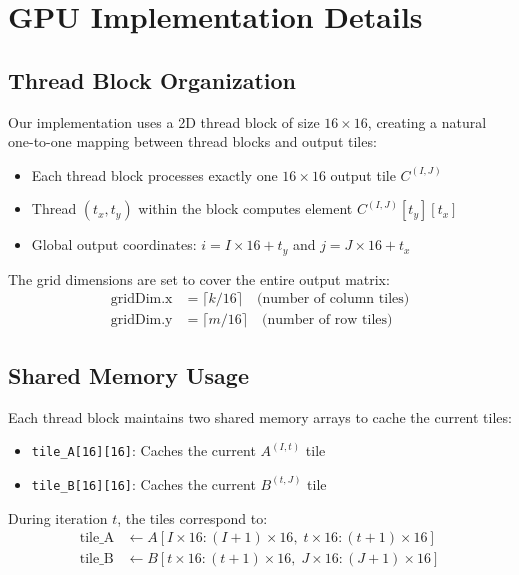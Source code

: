 \documentclass{amsbook}
\theoremstyle{definition}
\begin{document}
\section{GPU Implementation Details}

\subsection{Thread Block Organization}

Our implementation uses a 2D thread block of size $16 \times 16$, creating a natural one-to-one mapping between thread blocks and output tiles:
\begin{itemize}
\item Each thread block processes exactly one $16 \times 16$ output tile $C^{(I,J)}$
\item Thread $(t_x, t_y)$ within the block computes element $C^{(I,J)}[t_y][t_x]$
\item Global output coordinates: $i = I \times 16 + t_y$ and $j = J \times 16 + t_x$
\end{itemize}

The grid dimensions are set to cover the entire output matrix:
\begin{align}
\text{gridDim.x} &= \lceil k/16 \rceil \quad \text{(number of column tiles)} \\
\text{gridDim.y} &= \lceil m/16 \rceil \quad \text{(number of row tiles)}
\end{align}

\subsection{Shared Memory Usage}

Each thread block maintains two shared memory arrays to cache the current tiles:
\begin{itemize}
\item \texttt{tile\_A[16][16]}: Caches the current $A^{(I,t)}$ tile
\item \texttt{tile\_B[16][16]}: Caches the current $B^{(t,J)}$ tile
\end{itemize}

During iteration $t$, the tiles correspond to:
\begin{align}
\text{tile\_A} &\gets A[I \times 16 : (I+1) \times 16, \; t \times 16 : (t+1) \times 16] \\
\text{tile\_B} &\gets B[t \times 16 : (t+1) \times 16, \; J \times 16 : (J+1) \times 16]
\end{align}
\end{document}
